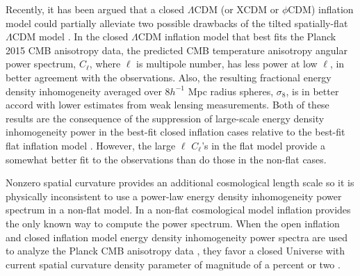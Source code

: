 \documentclass[useAMS,usenatbib]{mnras}
\begin{document}
Recently, it has been argued that a closed $\Lambda$CDM (or XCDM or $\phi$CDM) 
inflation model could partially alleviate two possible drawbacks of the tilted 
spatially-flat $\Lambda$CDM model \citep{2017arXiv170703452O,2017arXiv171003271O,2017arXiv171208617O}.
In the closed $\Lambda$CDM inflation model that best fits the Planck 2015
CMB anisotropy data, the predicted CMB temperature anisotropy angular power spectrum,
$C_\ell$, where $\ell$ is multipole number, has less power at low $\ell$, in  better agreement
with the observations. Also, the resulting fractional energy 
density inhomogeneity averaged over 8$h^{-1}$ Mpc radius spheres, $\sigma_8$, is in 
better accord with lower estimates from weak lensing measurements. Both of 
these results are the consequence of the suppression of large-scale energy 
density inhomogeneity power in the best-fit closed inflation cases relative 
to the best-fit flat inflation model 
\citep{2017arXiv170703452O,2017arXiv171003271O}. However, the large $\ell$
$C_\ell$'s in the flat model provide a somewhat better fit to the observations 
than do those in the non-flat cases.

Nonzero spatial curvature provides an additional cosmological length scale so 
it is physically inconsistent to use a power-law energy density inhomogeneity 
power spectrum in a non-flat model. In a non-flat cosmological 
model inflation provides the only known way to compute the power spectrum. When 
the open inflation \citep{1982Natur.295..304G,1994ApJ...432L...5R,1995PhRvD..52.1837R}
and closed inflation \citep{1984NuPhB.239..257H,1985PhRvD..31.1931R,2017arXiv170703439R}
model energy density inhomogeneity power spectra are used to 
analyze the Planck CMB anisotropy data \citep{2016A&A...594A..13P}, they favor 
a closed Universe with current spatial curvature density parameter of magnitude
of a percent or two \citep{2017arXiv170703452O,2017arXiv171003271O,2017arXiv171208617O}.     
    
\end{document}
